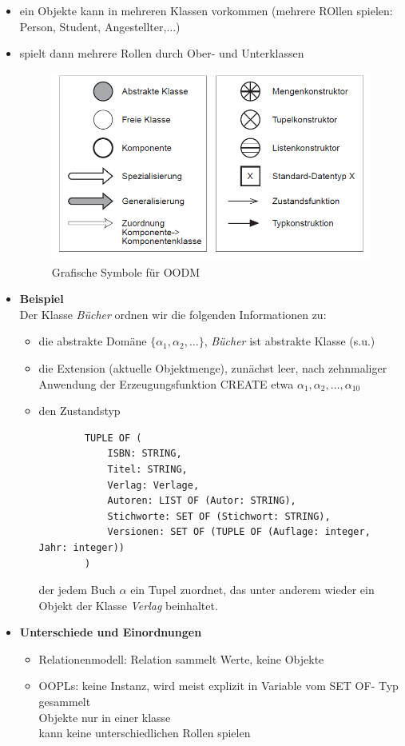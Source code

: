 \begin{itemize}
	\item ein Objekte kann in mehreren Klassen vorkommen (mehrere ROllen spielen: Person, Student, Angestellter,...)
	\item spielt dann mehrere Rollen durch Ober- und Unterklassen
	\begin{figure}[!h]
		\centering
		\includegraphics[scale=0.5]{img/legend_oodm.png}
		\caption{Grafische Symbole für OODM}
	\end{figure}
	
	\item \textbf{Beispiel}\\
	Der Klasse \textit{Bücher} ordnen wir die folgenden Informationen zu:
	\begin{itemize}
		\item die abstrakte Domäne $\{\alpha_1, \alpha_2, \ldots\}$, \textit{Bücher} ist abstrakte Klasse (s.u.)
		\item die Extension (aktuelle Objektmenge), zunächst leer, nach zehnmaliger Anwendung der Erzeugungsfunktion CREATE etwa $\alpha_1, \alpha_2, \ldots, \alpha_10$
		\item den Zustandstyp
		\begin{lstlisting}
		TUPLE OF (
			ISBN: STRING,
			Titel: STRING,
			Verlag: Verlage,
			Autoren: LIST OF (Autor: STRING),
			Stichworte: SET OF (Stichwort: STRING),
			Versionen: SET OF (TUPLE OF (Auflage: integer, Jahr: integer))
		)
		\end{lstlisting}
		der jedem Buch $\alpha$ ein Tupel zuordnet, das unter anderem wieder ein Objekt der Klasse \textit{Verlag} beinhaltet.
	\end{itemize}
	
	\item \textbf{Unterschiede und Einordnungen}
	\begin{itemize}
		\item Relationenmodell: Relation sammelt Werte, keine Objekte
		\item OOPLs: keine Instanz, wird meist explizit in Variable vom SET OF- Typ gesammelt\\
		Objekte nur in einer klasse\\
		kann keine unterschiedlichen Rollen spielen
	\end{itemize}
	

\end{itemize}
